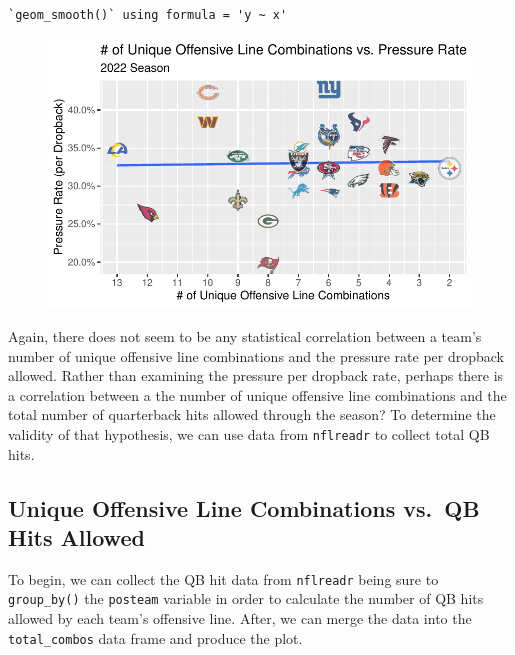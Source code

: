 \documentclass[
  letterpaper,
]{krantz}
\begin{document}
\begin{verbatim}
`geom_smooth()` using formula = 'y ~ x'
\end{verbatim}

\begin{figure}[H]

{\centering \includegraphics{01-nfl-analytics-and-r_files/figure-pdf/plot-pressure-rate-1.pdf}

}

\end{figure}

Again, there does not seem to be any statistical correlation between a
team's number of unique offensive line combinations and the pressure
rate per dropback allowed. Rather than examining the pressure per
dropback rate, perhaps there is a correlation between a the number of
unique offensive line combinations and the total number of quarterback
hits allowed through the season? To determine the validity of that
hypothesis, we can use data from \texttt{nflreadr} to collect total QB
hits.

\hypertarget{unique-offensive-line-combinations-vs.-qb-hits-allowed}{%
\subsection{Unique Offensive Line Combinations vs.~QB Hits
Allowed}\label{unique-offensive-line-combinations-vs.-qb-hits-allowed}}

To begin, we can collect the QB hit data from \texttt{nflreadr} being
sure to \texttt{group\_by()} the \texttt{posteam} variable in order to
calculate the number of QB hits allowed by each team's offensive line.
After, we can merge the data into the \texttt{total\_combos} data frame
and produce the plot.
\end{document}
